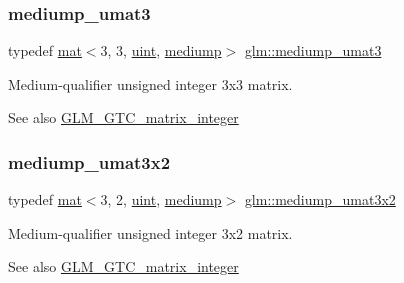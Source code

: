 \subsubsection{\texorpdfstring{mediump\+\_\+umat3}{mediump\_umat3}}
{\footnotesize\ttfamily typedef \mbox{\hyperlink{structglm_1_1mat}{mat}}$<$3, 3, \mbox{\hyperlink{group__core__precision_ga4fd29415871152bfb5abd588334147c8}{uint}}, \mbox{\hyperlink{namespaceglm_a36ed105b07c7746804d7fdc7cc90ff25a6416f3ea0c9025fb21ed50c4d6620482}{mediump}}$>$ \mbox{\hyperlink{group__gtc__matrix__integer_gaa677ebd95702fc95054de7a4fb4c907f}{glm\+::mediump\+\_\+umat3}}}

Medium-\/qualifier unsigned integer 3x3 matrix. \begin{DoxySeeAlso}{See also}
\mbox{\hyperlink{group__gtc__matrix__integer}{G\+L\+M\+\_\+\+G\+T\+C\+\_\+matrix\+\_\+integer}} 
\end{DoxySeeAlso}
\mbox{\label{group__gtc__matrix__integer_gad27333d041d86c7b0b78010c5a437846}} 
\subsubsection{\texorpdfstring{mediump\+\_\+umat3x2}{mediump\_umat3x2}}
{\footnotesize\ttfamily typedef \mbox{\hyperlink{structglm_1_1mat}{mat}}$<$3, 2, \mbox{\hyperlink{group__core__precision_ga4fd29415871152bfb5abd588334147c8}{uint}}, \mbox{\hyperlink{namespaceglm_a36ed105b07c7746804d7fdc7cc90ff25a6416f3ea0c9025fb21ed50c4d6620482}{mediump}}$>$ \mbox{\hyperlink{group__gtc__matrix__integer_gad27333d041d86c7b0b78010c5a437846}{glm\+::mediump\+\_\+umat3x2}}}

Medium-\/qualifier unsigned integer 3x2 matrix. \begin{DoxySeeAlso}{See also}
\mbox{\hyperlink{group__gtc__matrix__integer}{G\+L\+M\+\_\+\+G\+T\+C\+\_\+matrix\+\_\+integer}} 
\end{DoxySeeAlso}
\mbox{\label{group__gtc__matrix__integer_gac2563a9d45e3f6be0ceaf62b50a983f5}} 
